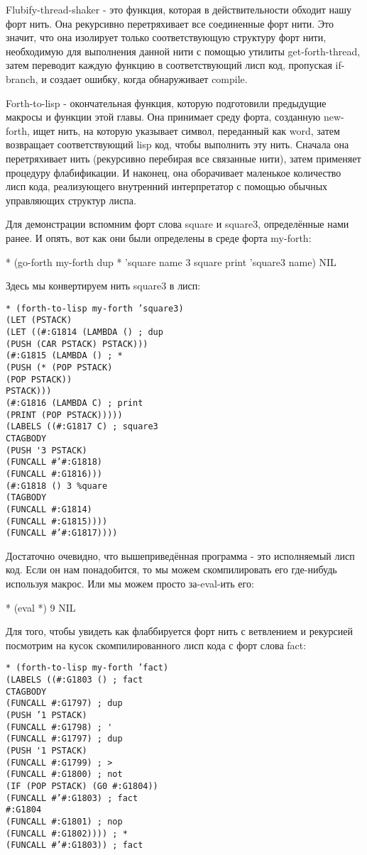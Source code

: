 {{{Flubify-thread-shaker - это функция, которая в действительности обходит нашу форт нить. Она рекурсивно перетряхивает все соединенные форт нити. Это значит, что она изолирует только соответствующую структуру форт нити, необходимую для выполнения данной нити с помощью утилиты get-forth-thread, затем переводит каждую функцию в соответствующий лисп код, пропуская if-branch, и создает ошибку, когда обнаруживает compile.

Forth-to-lisp - окончательная функция, которую подготовили предыдущие макросы и функции этой главы. Она принимает среду форта, созданную new-forth, ищет нить, на которую указывает символ, переданный как word, затем возвращает соответствующий lisp код, чтобы выполнить эту нить. Сначала она перетряхивает нить (рекурсивно перебирая все связанные нити), затем применяет процедуру флабификации. И наконец, она оборачивает маленькое количество лисп кода, реализующего внутренний интерпретатор с помощью обычных управляющих структур лиспа.

Для демонстрации вспомним форт слова square и square3, определённые нами ранее. И опять, вот как они были определены в среде форта my-forth:

* (go-forth my-forth
{ dup * } ’square name
{ 3 square print } ’square3 name)
NIL

Здесь мы конвертируем нить square3 в лисп:

\begin{verbatim}
* (forth-to-lisp my-forth ’square3)
(LET (PSTACK)
(LET ((#:G1814 (LAMBDA () ; dup
(PUSH (CAR PSTACK) PSTACK)))
(#:G1815 (LAMBDA () ; *
(PUSH (* (POP PSTACK)
(POP PSTACK))
PSTACK)))
(#:G1816 (LAMBDA C) ; print
(PRINT (POP PSTACK)))))
(LABELS ((#:G1817 C) ; square3
CTAGBODY
(PUSH '3 PSTACK)
(FUNCALL #’#:G1818)
(FUNCALL #:G1816)))
(#:G1818 () 3 %quare
(TAGBODY
(FUNCALL #:G1814)
(FUNCALL #:G1815))))
(FUNCALL #’#:G1817))))
\end{verbatim}

Достаточно очевидно, что вышеприведённая программа - это исполняемый лисп код. Если он нам понадобится, то мы можем скомпилировать его где-нибудь используя макрос. Или мы можем просто за-eval-ить его:

* (eval *)
9
NIL

Для того, чтобы увидеть как флаббируется форт нить с ветвлением и рекурсией посмотрим на кусок скомпилированного лисп кода с форт слова fact:

\begin{verbatim}
* (forth-to-lisp my-forth ’fact)
(LABELS ((#:G1803 () ; fact
CTAGBODY
(FUNCALL #:G1797) ; dup
(PUSH ’1 PSTACK)
(FUNCALL #:G1798) ; '
(FUNCALL #:G1797) ; dup
(PUSH '1 PSTACK)
(FUNCALL #:G1799) ; >
(FUNCALL #:G1800) ; not
(IF (POP PSTACK) (G0 #:G1804))
(FUNCALL #’#:G1803) ; fact
#:G1804
(FUNCALL #:G1801) ; nop
(FUNCALL #:G1802)))) ; *
(FUNCALL #’#:G1803)) ; fact
\end{verbatim}

}}}
